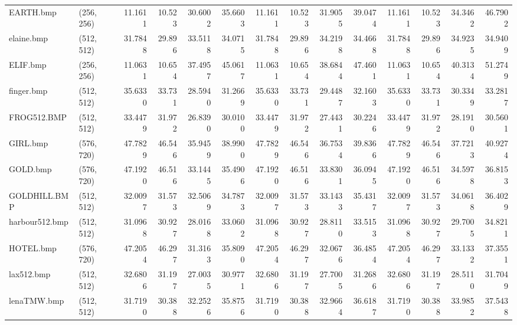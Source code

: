 \documentclass{article}
\begin{document}
\begin{table}[H]
\begin{adjustbox}{center}
\begin{tabular}{llrrrrrrrrrrrr}
         EARTH.bmp &  (256, 256) &   11.1611 &    10.523 &   30.6002 &   35.6603 &   11.1611 &    10.523 &   31.9055 &   39.0474 &   11.1611 &    10.523 &   34.3462 &   46.7902 \\
        elaine.bmp &  (512, 512) &   31.7848 &    29.896 &   33.5118 &   34.0715 &   31.7848 &    29.896 &   34.2198 &   34.4668 &   31.7848 &    29.896 &   34.9235 &   34.9409 \\
          ELIF.bmp &  (256, 256) &   11.0631 &    10.654 &   37.4957 &   45.0617 &   11.0631 &    10.654 &   38.6844 &   47.4601 &   11.0631 &    10.654 &   40.3134 &   51.2749 \\
        finger.bmp &  (512, 512) &   35.6330 &    33.731 &   28.5940 &   31.2669 &   35.6330 &    33.731 &   29.4487 &   32.1603 &   35.6330 &    33.731 &   30.3349 &   33.2817 \\
       FROG512.BMP &  (512, 512) &   33.4479 &    31.972 &   26.8390 &   30.0100 &   33.4479 &    31.972 &   27.4431 &   30.2246 &   33.4479 &    31.972 &   28.1910 &   30.5601 \\
          GIRL.bmp &  (576, 720) &   47.7829 &    46.546 &   35.9459 &   38.9900 &   47.7829 &    46.546 &   36.7534 &   39.8366 &   47.7829 &    46.546 &   37.7213 &   40.9274 \\
          GOLD.bmp &  (576, 720) &   47.1920 &    46.516 &   33.1445 &   35.4906 &   47.1920 &    46.516 &   33.8301 &   36.0945 &   47.1920 &    46.516 &   34.5978 &   36.8153 \\
      GOLDHILL.BMP &  (512, 512) &   32.0097 &    31.573 &   32.5069 &   34.7873 &   32.0097 &    31.573 &   33.1433 &   35.4317 &   32.0097 &    31.573 &   34.0618 &   36.4029 \\
    harbour512.bmp &  (512, 512) &   31.0968 &    30.927 &   28.0168 &   33.0602 &   31.0968 &    30.927 &   28.8110 &   33.5153 &   31.0968 &    30.927 &   29.7005 &   34.8211 \\
         HOTEL.bmp &  (576, 720) &   47.2054 &    46.297 &   31.3163 &   35.8090 &   47.2054 &    46.297 &   32.0676 &   36.4854 &   47.2054 &    46.297 &   33.1332 &   37.3551 \\
        lax512.bmp &  (512, 512) &   32.6806 &    31.197 &   27.0035 &   30.9771 &   32.6806 &    31.197 &   27.7005 &   31.2686 &   32.6806 &    31.197 &   28.5110 &   31.7049 \\
       lenaTMW.bmp &  (512, 512) &   31.7190 &    30.388 &   32.2526 &   35.8756 &   31.7190 &    30.388 &   32.9664 &   36.6187 &   31.7190 &    30.388 &   33.9852 &   37.5438 \\

\end{tabular}
\end{adjustbox}
\end{table}
\end{document}

